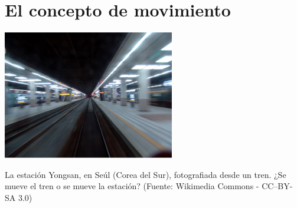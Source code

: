 \section{El concepto de movimiento}

\begin{floatingfigure}[r]{8cm}
  \centering
  \href{https://commons.wikimedia.org/wiki/File:Leaving_Yongsan_Station.jpg#/media/File:Leaving_Yongsan_Station.jpg}{\includegraphics[width=7.5cm]{img/yongsan.pdf}}
  \caption{La estación Yongsan, en Seúl (Corea del Sur), fotografiada desde un tren. ¿Se mueve el tren o se mueve la estación? (Fuente: Wikimedia Commons - CC--BY-SA 3.0)}
\end{floatingfigure}

